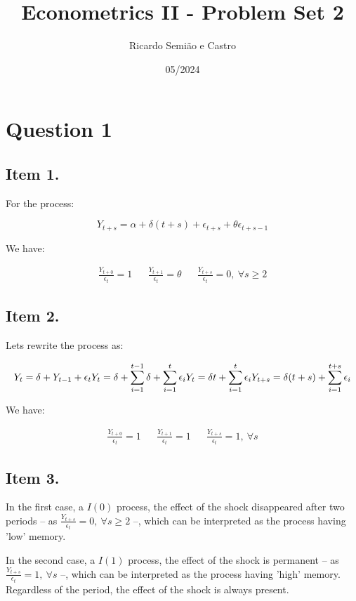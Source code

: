 \documentclass[12pt]{article}
\title{Econometrics II - Problem Set 2}
\author{Ricardo Semião e Castro}
\date{05/2024}
\begin{document}
\maketitle


\section*{Question 1}

\subsection*{Item 1.}
For the process:

$$
Y_{t+s} = \alpha + \delta(t+s) + \epsilon_{t+s} + \theta \epsilon_{t+s-1}
$$

We have:

\begin{align*}
    &\frac{Y_{t+0}}{\epsilon_{t}} = 1&
    &\frac{Y_{t+1}}{\epsilon_{t}} = \theta&
    &\frac{Y_{t+s}}{\epsilon_{t}} = 0,~ \forall s \geq 2&
\end{align*}


\subsection*{Item 2.}

Lets rewrite the process as:

$$
Y_{t} = \delta + Y_{t-1} + \epsilon_{t}\\
Y_{t} = \delta + \sum_{i=1}^{t-1}\delta + \sum_{i=1}^{t}\epsilon_{i}\\
Y_{t} = \delta t + \sum_{i=1}^{t}\epsilon_{i}\\
Y_{t+s} = \delta (t+s) + \sum_{i=1}^{t+s}\epsilon_{i}
$$

We have:

\begin{align*}
    &\frac{Y_{t+0}}{\epsilon_{t}} = 1&
    &\frac{Y_{t+1}}{\epsilon_{t}} = 1&
    &\frac{Y_{t+s}}{\epsilon_{t}} = 1,~ \forall s&
\end{align*}


\subsection*{Item 3.}
In the first case, a $I(0)$ process, the effect of the shock disappeared after two periods -- as $\frac{Y_{t+s}}{\epsilon_{t}} = 0,~ \forall s \geq 2$ --, which can be interpreted as the process having 'low' memory.

In the second case, a $I(1)$ process, the effect of the shock is permanent -- as $\frac{Y_{t+s}}{\epsilon_{t}} = 1,~ \forall s$ --, which can be interpreted as the process having 'high' memory. Regardless of the period, the effect of the shock is always present.
\end{document}
